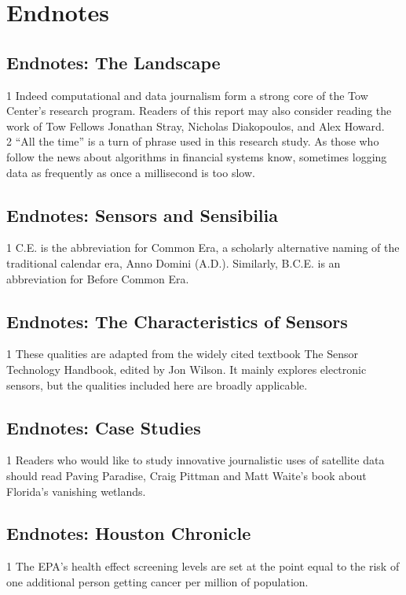 \chapter{Endnotes}


\section{Endnotes: The Landscape}
1 Indeed computational and data journalism form a strong core of the Tow Center's research program. Readers of this report may also consider reading the work of Tow Fellows Jonathan Stray, Nicholas Diakopoulos, and Alex Howard.\\
2 ``All the time'' is a turn of phrase used in this research study. As those who follow the news about algorithms in financial systems know, sometimes logging data as frequently as once a millisecond
is too slow.\\

\section{Endnotes: Sensors and Sensibilia}
1 C.E. is the abbreviation for Common Era, a scholarly alternative naming of the traditional calendar era, Anno Domini (A.D.). Similarly, B.C.E. is an abbreviation for Before Common Era.\\

\section{Endnotes: The Characteristics of Sensors}
1 These qualities are adapted from the widely cited textbook The Sensor Technology Handbook,
edited by Jon Wilson. It mainly explores electronic sensors, but the qualities included here are
broadly applicable.\\

\section{Endnotes: Case Studies}
1 Readers who would like to study innovative journalistic uses of satellite data should read Paving Paradise, Craig Pittman and Matt Waite's book about Florida's vanishing wetlands.\\

\section{Endnotes: Houston Chronicle}
1 The EPA's health effect screening levels are set at the point equal to the risk of one additional
person getting cancer per million of population.\\


